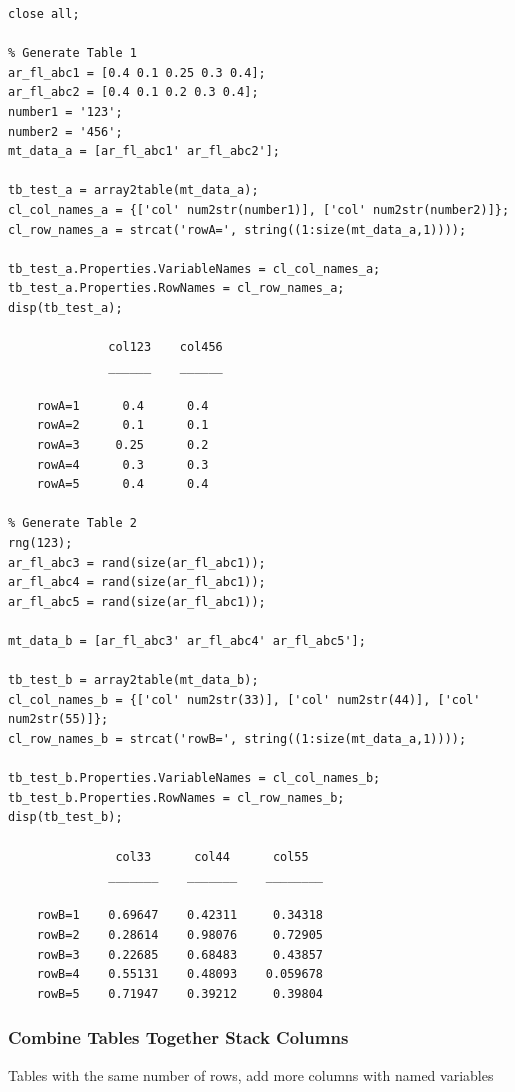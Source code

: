 \documentclass[
]{book}
\begin{document}
\begin{verbatim}
close all;

% Generate Table 1
ar_fl_abc1 = [0.4 0.1 0.25 0.3 0.4];
ar_fl_abc2 = [0.4 0.1 0.2 0.3 0.4];
number1 = '123';
number2 = '456';
mt_data_a = [ar_fl_abc1' ar_fl_abc2'];

tb_test_a = array2table(mt_data_a);
cl_col_names_a = {['col' num2str(number1)], ['col' num2str(number2)]};
cl_row_names_a = strcat('rowA=', string((1:size(mt_data_a,1))));

tb_test_a.Properties.VariableNames = cl_col_names_a;
tb_test_a.Properties.RowNames = cl_row_names_a;
disp(tb_test_a);

              col123    col456
              ______    ______

    rowA=1      0.4      0.4  
    rowA=2      0.1      0.1  
    rowA=3     0.25      0.2  
    rowA=4      0.3      0.3  
    rowA=5      0.4      0.4  

% Generate Table 2
rng(123);
ar_fl_abc3 = rand(size(ar_fl_abc1));
ar_fl_abc4 = rand(size(ar_fl_abc1));
ar_fl_abc5 = rand(size(ar_fl_abc1));

mt_data_b = [ar_fl_abc3' ar_fl_abc4' ar_fl_abc5'];

tb_test_b = array2table(mt_data_b);
cl_col_names_b = {['col' num2str(33)], ['col' num2str(44)], ['col' num2str(55)]};
cl_row_names_b = strcat('rowB=', string((1:size(mt_data_a,1))));

tb_test_b.Properties.VariableNames = cl_col_names_b;
tb_test_b.Properties.RowNames = cl_row_names_b;
disp(tb_test_b);

               col33      col44      col55  
              _______    _______    ________

    rowB=1    0.69647    0.42311     0.34318
    rowB=2    0.28614    0.98076     0.72905
    rowB=3    0.22685    0.68483     0.43857
    rowB=4    0.55131    0.48093    0.059678
    rowB=5    0.71947    0.39212     0.39804
\end{verbatim}

\hypertarget{combine-tables-together-stack-columns}{%
\subsubsection{Combine Tables Together Stack Columns}\label{combine-tables-together-stack-columns}}

Tables with the same number of rows, add more columns with named
variables
\end{document}
